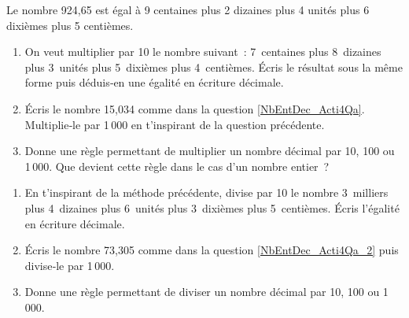 \begin{activite}

\begin{partie}
Le nombre 924,65 est égal à 9 centaines plus 2 dizaines plus 4 unités plus 6 dixièmes plus 5 centièmes.
\begin{enumerate}
 \item On veut multiplier par 10 le nombre suivant : 7 centaines plus 8 dizaines plus 3 unités plus 5 dixièmes plus 4 centièmes. Écris le résultat sous la même forme puis déduis‑en une égalité en écriture décimale. \label{NbEntDec_Acti4Qa}
 \item Écris le nombre 15,034 comme dans la question \ref{NbEntDec_Acti4Qa}. Multiplie‑le par 1\,000 en t'inspirant de la question précédente.
 \item Donne une règle permettant de multiplier un nombre décimal par 10, 100 ou 1\,000. Que devient cette règle dans le cas d'un nombre entier ?
 \end{enumerate}
\end{partie}

\begin{partie}
\begin{enumerate}
 \item En t'inspirant de la méthode précédente, divise par 10 le nombre 3 milliers plus 4 dizaines plus 6 unités plus 3 dixièmes plus 5 centièmes. Écris l'égalité en écriture décimale. \label{NbEntDec_Acti4Qa_2}
 \item Écris le nombre 73,305 comme dans la question \ref{NbEntDec_Acti4Qa_2} puis divise‑le par 1\,000.
 \item Donne une règle permettant de diviser un nombre décimal par 10, 100 ou 1\,000.
 \end{enumerate}
\end{partie}

\end{activite}



